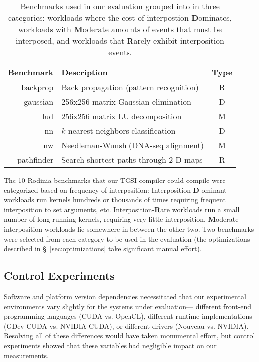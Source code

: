 \begin{table*}[!ht]
  \centering
  \begin{tabular}{rlc}
    \toprule
    \textbf{Benchmark} & \textbf{Description} & \textbf{Type} \\
    \midrule
    backprop & Back propagation (pattern recognition) & R \\
    gaussian & 256x256 matrix Gaussian elimination & D \\
    lud & 256x256 matrix LU decomposition & M \\
    nn & $k$-nearest neighbors classification & D \\
    nw & Needleman-Wunsh (DNA-seq alignment) & M \\
    pathfinder & Search shortest paths through 2-D maps & R \\
    \bottomrule
  \end{tabular}
  \caption{Benchmarks used in our evaluation grouped into in three categories:
  workloads where the cost of interpostion \textbf{D}ominates, workloads with \textbf{M}oderate amounts of events that must be interposed, and workloads that \textbf{R}arely exhibit interposition events.}
  \label{tb_bench}
\end{table*}

The 10 Rodinia benchmarks that our TGSI compiler could compile were
categorized based on frequency of interposition: Interposition-\textbf{D}
ominant workloads run kernels hundreds or thousands of times requiring
frequent interposition to set arguments, etc. Interposition-\textbf{R}are
workloads run a small number of long-running kernels, requiring very little
interposition. \textbf{M}oderate-interposition workloads lie somewhere in
between the other two. Two benchmarks were selected from each category
to be used in the evaluation (the optimizations described in
\S~\ref{sec:optimizations} take significant manual effort).

\subsection{Control Experiments}
\label{sec:control}

Software and platform version dependencies necessitated that our experimental
environments vary slightly for the systems under evaluation---%
different front-end programming languages (CUDA vs. OpenCL), different runtime
implementations (GDev CUDA vs. NVIDIA CUDA), or different drivers (Nouveau vs.
NVIDIA). Resolving all of these differences would have taken monumental
effort, but control experiments showed that these variables had negligible
impact on our measurements.

